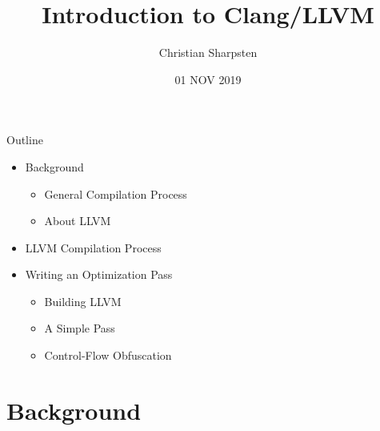 \documentclass{beamer}
\title{Introduction to Clang/LLVM}
\author{Christian Sharpsten}
\date{01 NOV 2019}
\begin{document}

\begin{frame}
    \maketitle
\end{frame}

\begin{frame}{Outline}
    \begin{itemize}
        \item Background
        \begin{itemize}
            \item General Compilation Process
            \item About LLVM
        \end{itemize}
        \vspace{1ex}

        \item LLVM Compilation Process
        \vspace{1ex}

        \item Writing an Optimization Pass
        \begin{itemize}
            \item Building LLVM
            \item A Simple Pass
            \item Control-Flow Obfuscation
        \end{itemize}
    \end{itemize}
\end{frame}


\section{Background}

\end{document}

